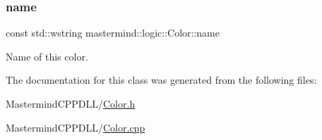 \subsubsection{\texorpdfstring{name}{name}}
{\footnotesize\ttfamily const std\+::wstring mastermind\+::logic\+::\+Color\+::name\hspace{0.3cm}{\ttfamily [private]}}



Name of this color. 



The documentation for this class was generated from the following files\+:\begin{DoxyCompactItemize}
\item 
Mastermind\+C\+P\+P\+D\+L\+L/\hyperlink{_color_8h}{Color.\+h}\item 
Mastermind\+C\+P\+P\+D\+L\+L/\hyperlink{_color_8cpp}{Color.\+cpp}\end{DoxyCompactItemize}
